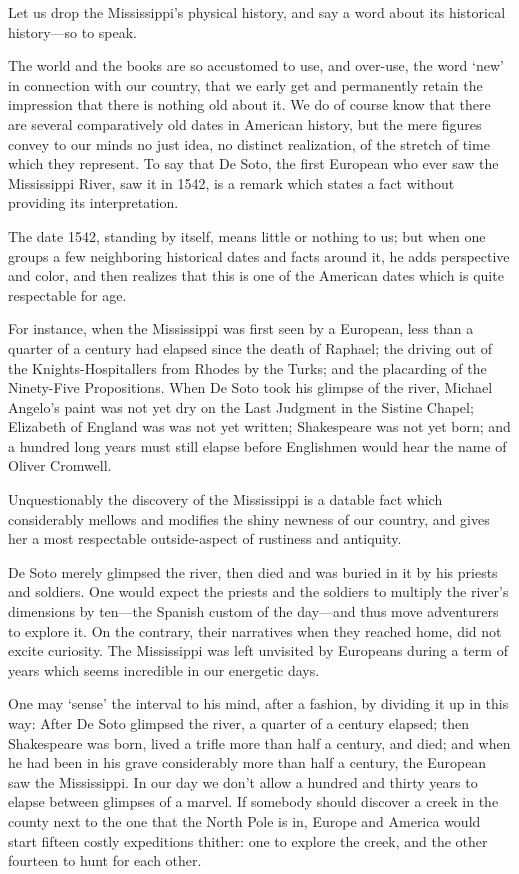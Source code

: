 \documentclass[../../../demo.tex]{novelettesubdoc}
\begin{document}

Let us drop the Mississippi's physical history, and say a word about its
historical history---so to speak.

The world and the books are so accustomed to use, and over-use, the word
`new' in connection with our country, that we early get and permanently
retain the impression that there is nothing old about it. We do of
course know that there are several comparatively old dates in American
history, but the mere figures convey to our minds no just idea, no
distinct realization, of the stretch of time which they represent.
To say that De Soto, the first European who ever saw the Mississippi
River, saw it in 1542, is a remark which states a fact without
providing its interpretation.

The date 1542, standing by itself, means little or nothing to us; but
when one groups a few neighboring historical dates and facts around it,
he adds perspective and color, and then realizes that this is one of the
American dates which is quite respectable for age.

For instance, when the Mississippi was first seen by a European, less
than a quarter of a century had elapsed since the death of Raphael;
the driving out of the Knights-Hospitallers from Rhodes by
the Turks; and the placarding of the Ninety-Five Propositions.
When De Soto took his glimpse of the river,
Michael Angelo's paint was not yet dry on the Last
Judgment in the Sistine Chapel; Elizabeth of England was
 was not yet written;
Shakespeare was not yet born;
and a hundred long years must
still elapse before Englishmen would hear the name of Oliver Cromwell.

Unquestionably the discovery of the Mississippi is a datable fact which
considerably mellows and modifies the shiny newness of our country, and
gives her a most respectable outside-aspect of rustiness and antiquity.

De Soto merely glimpsed the river, then died and was buried in it by his
priests and soldiers. One would expect the priests and the soldiers
to multiply the river's dimensions by ten---the Spanish custom of the
day---and thus move adventurers to
explore it. On the contrary, their narratives when they reached home,
did not excite  curiosity. The Mississippi was left
unvisited by Europeans during a term of years which seems incredible in our
energetic days.

One may `sense' the interval to his mind, after a fashion, by dividing it
up in this way: After De Soto glimpsed the river,
a quarter of a century elapsed; then Shakespeare was born,
lived a trifle more than half a century, and died; and when he had been in
his grave considerably more than half a century, the  European
saw the Mississippi. In our day we don't allow a hundred and thirty years to
elapse between glimpses of a marvel. If somebody should discover a creek
in the county next to the one that the North Pole is in, Europe and
America would start fifteen costly expeditions thither: one to explore
the creek, and the other fourteen to hunt for each other.
\end{document}
